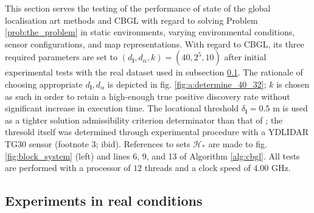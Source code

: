 This section serves the testing of the performance of state of the global
localisation art methods and CBGL with regard to solving Problem
\ref{prob:the_problem} in static environments, varying environmental
conditions, sensor configurations, and map representations. With regard to CBGL,
its three required parameters are set to $(d_{\bm{l}},d_{\alpha},k) = (40, 2^5,
10)$ after initial experimental tests with the real dataset used in subsection
\ref{subsec:exp_a}. The rationale of choosing appropriate
$d_{\bm{l}},d_{\alpha}$ is depicted in fig. \ref{fig:a:determine_40_32};
$k$ is chosen as such in order to retain a high-enough true positive discovery
rate without significant increase in execution time. The locational threshold
$\delta_{\bm{l}} = 0.5$ m is used as a tighter solution admissibility criterion
determinator than that of \cite{Filotheou2022g}; the thresold itself was
determined through experimental procedure with a YDLIDAR TG30 sensor (footnote
3; ibid).
References to sets $\mathcal{H}_{\ast}$ are made to fig. \ref{fig:block_system}
(left) and lines
6, 9, and 13 of Algorithm
\ref{alg:cbgl}.
All tests are performed with a processor of $12$
threads and a clock speed of $4.00$ GHz.


\subsection{Experiments in real conditions}
\label{subsec:exp_a}

